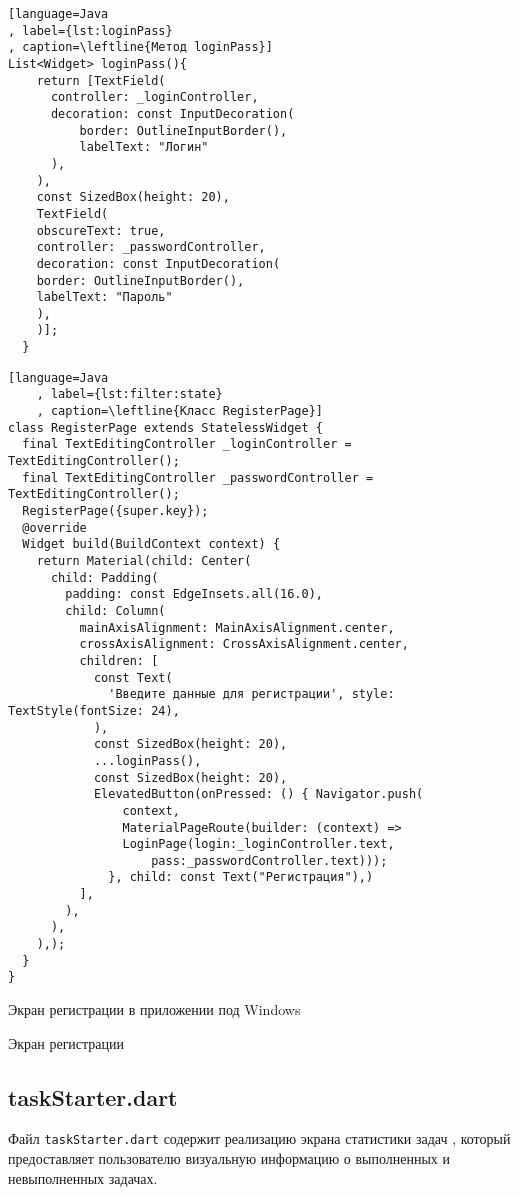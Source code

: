 \begin{lstlisting}[language=Java
, label={lst:loginPass}
, caption=\leftline{Метод loginPass}]
List<Widget> loginPass(){
    return [TextField(
      controller: _loginController,
      decoration: const InputDecoration(
          border: OutlineInputBorder(),
          labelText: "Логин"
      ),
    ),
    const SizedBox(height: 20),
    TextField(
    obscureText: true,
    controller: _passwordController,
    decoration: const InputDecoration(
    border: OutlineInputBorder(),
    labelText: "Пароль"
    ),
    )];
  }
\end{lstlisting}
\clearpage
\begin{lstlisting}[language=Java
	, label={lst:filter:state}
	, caption=\leftline{Класс RegisterPage}]
class RegisterPage extends StatelessWidget {
  final TextEditingController _loginController = TextEditingController();
  final TextEditingController _passwordController = TextEditingController();
  RegisterPage({super.key});
  @override
  Widget build(BuildContext context) {
    return Material(child: Center(
      child: Padding(
        padding: const EdgeInsets.all(16.0),
        child: Column(
          mainAxisAlignment: MainAxisAlignment.center,
          crossAxisAlignment: CrossAxisAlignment.center,
          children: [
            const Text(
              'Введите данные для регистрации', style: TextStyle(fontSize: 24),
            ),
            const SizedBox(height: 20),
            ...loginPass(),
            const SizedBox(height: 20),
            ElevatedButton(onPressed: () { Navigator.push(
                context,
                MaterialPageRoute(builder: (context) =>
                LoginPage(login:_loginController.text,
                    pass:_passwordController.text)));
              }, child: const Text("Регистрация"),)
          ],
        ),
      ),
    ),);
  }
}
\end{lstlisting}
\clearpage
Экран регистрации в приложении под Windows 
\begin{image}
	\caption{Экран регистрации}
	\label{fig:filter}
\end{image}

\clearpage

\subsection{taskStarter.dart}

Файл \texttt{taskStarter.dart}  содержит реализацию экрана
статистики задач ,
который предоставляет пользователю визуальную информацию
о выполненных и невыполненных задачах.

